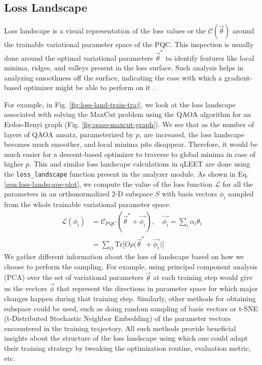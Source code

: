 \documentclass[%
 reprint,
 amsmath,
 amssymb,
 showkeys,
 pra,
 floatfix,
]{revtex4-2}
\begin{document}
\subsection{Loss Landscape}

Loss landscape is a visual representation of the loss values or the $\mathcal{C}(\vec{\theta})$ around the trainable variational parameter space of the PQC. This inspection is usually done around the optimal variational parameters $\vec{\theta}^{*}$ to identify features like local minima, ridges, and valleys present in the loss surface. Such analysis helps in analyzing smoothness off the surface, indicating the ease with which a gradient-based optimizer might be able to perform on it \citep{loss-landscapes}. 

For example, in Fig. \ref{fig:loss-land-train-traj}, we look at the loss landscape associated with solving the MaxCut problem using the QAOA algorithm \cite{2014arXiv1411.4028F} for an Erdos-Renyi graph (Fig. \ref{fig:qoao-maxcut-graph}). We see that as the number of layers of QAOA ansatz, parameterized by $p$, are increased, the loss landscape becomes much smoother, and local minima pits disappear. Therefore, it would be much easier for a descent-based optimizer to traverse to global minima in case of higher $p$. This and similar loss landscape calculations in qLEET are done using the \texttt{loss\_landscape} function present in the analyzer module. As shown in Eq. \ref{eqn:loss-landscape-plot}, we compute the value of the loss function $\mathcal{L}$ for all the parameters in an orthonormalized 2-D subspace $S$ with basis vectors $\phi_i$ sampled from the whole trainable variational parameter space. 
\begin{equation}\label{eqn:loss-landscape-plot}
    \begin{split}
        \mathcal{L}(\phi_i) 
        &= \mathcal{C}_{\text{PQC}}(\vec{\theta}^* + \vec{\phi_i}), \quad \vec{\phi_i} = \sum_i \alpha_i \theta_i\\ 
        &= \sum_{O} \text{Tr}\Bigg[O\rho \bigg(\vec{\theta}^* + \vec{\phi_i} \bigg) \Bigg]
    \end{split}
\end{equation}
We gather different information about the loss of landscape based on how we choose to perform the sampling. For example, using principal component analysis (PCA) over the set of variational parameters $\vec{\theta}$ at each training step would give us the vectors $\vec{\phi}$ that represent the directions in parameter space for which major changes happen during that training step. Similarly, other methods for obtaining subspace could be used, such as doing random sampling of basis vectors or t-SNE (t-Distributed Stochastic Neighbor Embedding) of the parameter vectors encountered in the training trajectory. All such methods provide beneficial insights about the structure of the loss landscape using which one could adapt their training strategy by tweaking the optimization routine, evaluation metric, etc. 
\end{document}
